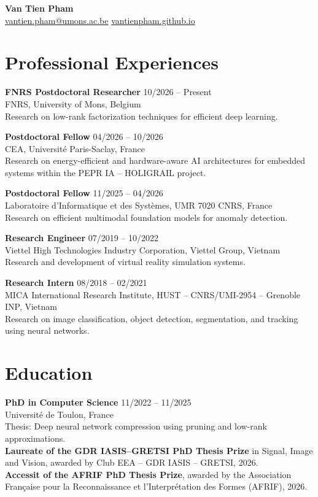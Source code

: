 \documentclass[11pt,a4paper]{article}
\newcommand{\entry}[4]{%
  \textbf{#1} \hfill #2\\
  #3\\
  #4
}
\begin{document}
\begin{center}
  {\LARGE\bfseries Van Tien Pham}\\
  \vspace{0.3em}
  \href{mailto:vantien.pham@umons.ac.be}{vantien.pham@umons.ac.be} \quad
  \href{https://vantienpham.github.io}{vantienpham.github.io}
\end{center}


\section{Professional Experiences}
\entry
{FNRS Postdoctoral Researcher}
{10/2026 -- Present}
{FNRS, University of Mons, Belgium}
{Research on low-rank factorization techniques for efficient deep learning.}

\entry
{Postdoctoral Fellow}
{04/2026 -- 10/2026}
{CEA, Université Paris-Saclay, France}
{Research on energy-efficient and hardware-aware AI architectures for embedded systems within the PEPR IA – HOLIGRAIL project.}

\entry
{Postdoctoral Fellow}
{11/2025 -- 04/2026}
{Laboratoire d'Informatique et des Systèmes, UMR 7020 CNRS, France}
{Research on efficient multimodal foundation models for anomaly detection.}

\entry
{Research Engineer}
{07/2019 -- 10/2022}
{Viettel High Technologies Industry Corporation, Viettel Group, Vietnam}
{Research and development of virtual reality simulation systems.}

\entry
{Research Intern}
{08/2018 -- 02/2021}
{MICA International Research Institute, HUST – CNRS/UMI-2954 – Grenoble INP, Vietnam}
{Research on image classification, object detection, segmentation, and tracking using neural networks.}
\section{Education}

\entry
{PhD in Computer Science}
{11/2022 -- 11/2025}
{Université de Toulon, France}
{Thesis: Deep neural network compression using pruning and low-rank approximations.\\
  \textbf{Laureate of the GDR IASIS–GRETSI PhD Thesis Prize} in Signal, Image and Vision, awarded by Club EEA – GDR IASIS – GRETSI, 2026.\\
  \textbf{Accessit of the AFRIF PhD Thesis Prize}, awarded by the Association Française pour la Reconnaissance et l’Interprétation des Formes (AFRIF), 2026.
}
\end{document}
